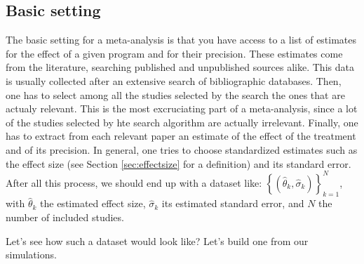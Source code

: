 \documentclass[]{book}
\theoremstyle{definition}
\theoremstyle{definition}
\theoremstyle{definition}
\theoremstyle{remark}
\let\BeginKnitrBlock\begin \let\EndKnitrBlock\end
\begin{document}
\hypertarget{basic-setting}{%
\subsection{Basic setting}\label{basic-setting}}

The basic setting for a meta-analysis is that you have access to a list of estimates for the effect of a given program and for their precision.
These estimates come from the literature, searching published and unpublished sources alike.
This data is usually collected after an extensive search of bibliographic databases.
Then, one has to select among all the studies selected by the search the ones that are actualy relevant.
This is the most excruciating part of a meta-analysis, since a lot of the studies selected by hte search algorithm are actually irrelevant.
Finally, one has to extract from each relevant paper an estimate of the effect of the treatment and of its precision.
In general, one tries to choose standardized estimates such as the effect size (see Section \ref{sec:effectsize} for a definition) and its standard error.
After all this process, we should end up with a dataset like: \(\left\{(\hat{\theta}_k,\hat{\sigma}_k)\right\}_{k=1}^N\), with \(\hat{\theta}_k\) the estimated effect size, \(\hat{\sigma}_k\) its estimated standard error, and \(N\) the number of included studies.

\BeginKnitrBlock{example}
\protect\hypertarget{exm:unnamed-chunk-143}{}{\label{exm:unnamed-chunk-143} }Let's see how such a dataset would look like?
Let's build one from our simulations.
\EndKnitrBlock{example}
\end{document}
